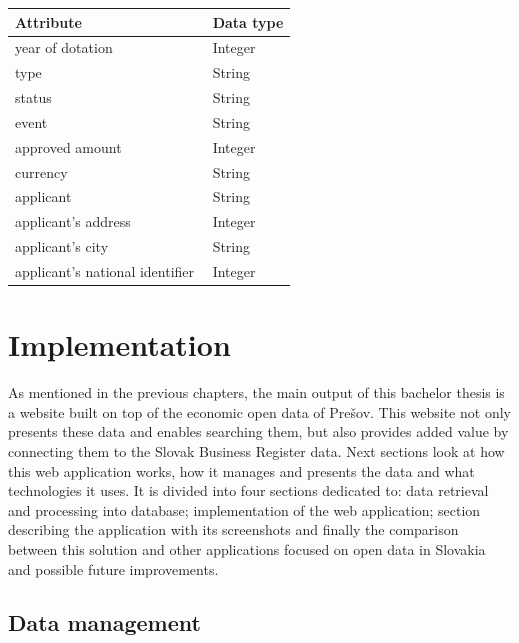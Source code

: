 \documentclass[thesis=B,english]{sprlajur-slovakopendata}[2018/05/12]
\begin{document}
\begin{center}
	\begin{tabular}{  p{0.7\linewidth} | p{0.3\linewidth} }
		Attribute                       & Data type \\ \hline
		year of dotation                & Integer   \\
		type                            & String    \\
		status                          & String    \\
		event                           & String    \\
		approved amount                 & Integer   \\
		currency                        & String    \\
		applicant                       & String    \\
		applicant's address             & Integer   \\
		applicant's city                & String    \\
		applicant's national identifier & Integer   \\
	\end{tabular}
\end{center} 
	
\chapter{Implementation}
\label{implementation}
As mentioned in the previous chapters, the main output of this bachelor thesis is a website built on top of the economic open data of Prešov. This website not only presents these data and enables searching them, but also provides added value by connecting them to the Slovak Business Register data. Next sections look at how this web application works, how it manages and presents the data and what technologies it uses.   It is divided into four sections dedicated to: data retrieval and processing into database; implementation of the web application; section describing the application with its screenshots and finally the comparison between this solution and other applications focused on open data in Slovakia and possible future improvements.
\section{Data management}
\end{document}
